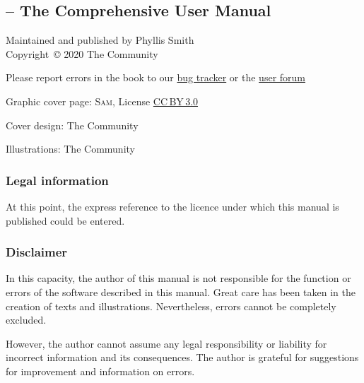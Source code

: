 %
\begingroup %
\setlength{\parskip}{0.4\baselineskip}
\subsection*{\sffamily\CGG{} -- The Comprehensive User Manual}
\label{sec:Impressum}
%
%
Maintained and published by Phyllis Smith\\[+1.2em]
Copyright~\copyright{} 2020 The \CGG{} Community\par
Please report errors in the book to our \href{https://www.cinelerra-gg.org/bugtracker/}{bug tracker} or the \href{https://www.cinelerra-gg.org/forum/}{user forum}\par
Graphic cover page: \textsc{Sam}, License
\textsc{\href{https://creativecommons.org/licenses/by/3.0/}{CC\,BY\,3.0}}\par
Cover design: The \CGG{} Community\par
Illustrations: The \CGG{} Community%
\bigskip%

\footnotesize
\subsubsection*{\sffamily{}Legal information}
\label{sec:Legal-information}
At this point, the express reference to the licence under which this
manual is published could be entered.

\subsubsection*{\sffamily{}Disclaimer}
\label{sec:Disclaimer}
%
%
In this capacity, the author of this manual is not responsible for
the function or errors of the software described in this
manual. Great care has been taken in the creation of texts and
illustrations. Nevertheless, errors cannot be completely
excluded.\par
However, the author cannot assume any legal responsibility or
liability for incorrect information and its consequences. The author
is grateful for suggestions for improvement and information on
errors.

